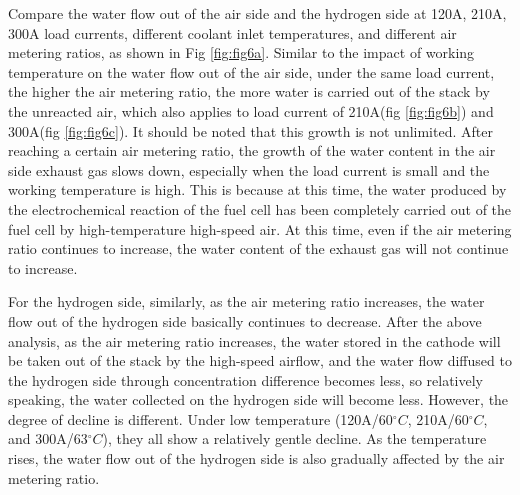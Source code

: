 Compare the water flow out of the air side and the hydrogen side at 120A, 210A, 300A load currents, different coolant inlet temperatures, and different air metering ratios, as shown in Fig \ref{fig:fig6a}. Similar to the impact of working temperature on the water flow out of the air side, under the same load current, the higher the air metering ratio, the more water is carried out of the stack by the unreacted air, which also applies to load current of 210A(fig \ref{fig:fig6b}) and 300A(fig \ref{fig:fig6c}). It should be noted that this growth is not unlimited. After reaching a certain air metering ratio, the growth of the water content in the air side exhaust gas slows down, especially when the load current is small and the working temperature is high. This is because at this time, the water produced by the electrochemical reaction of the fuel cell has been completely carried out of the fuel cell by high-temperature high-speed air. At this time, even if the air metering ratio continues to increase, the water content of the exhaust gas will not continue to increase.

\par
For the hydrogen side, similarly, as the air metering ratio increases, the water flow out of the hydrogen side basically continues to decrease. After the above analysis, as the air metering ratio increases, the water stored in the cathode will be taken out of the stack by the high-speed airflow, and the water flow diffused to the hydrogen side through concentration difference becomes less, so relatively speaking, the water collected on the hydrogen side will become less. However, the degree of decline is different. Under low temperature (120A/60$^{\circ}C$, 210A/60$^{\circ}C$, and 300A/63$^{\circ}C$), they all show a relatively gentle decline. As the temperature rises, the water flow out of the hydrogen side is also gradually affected by the air metering ratio.



